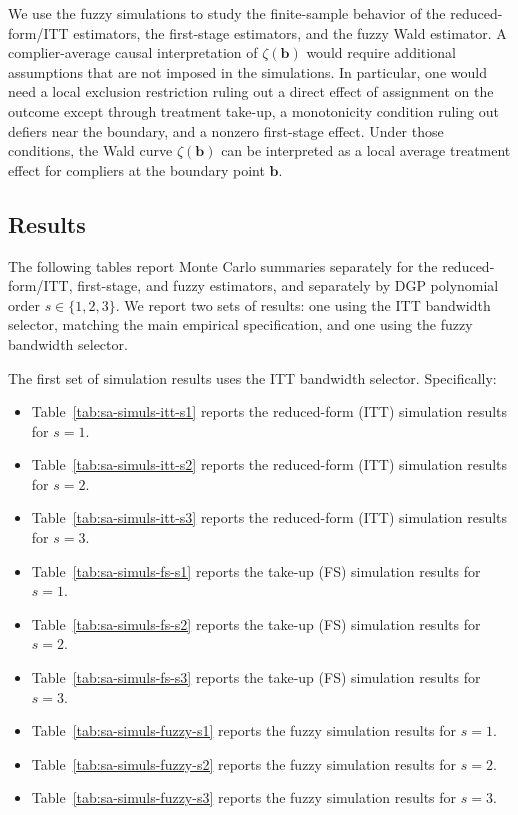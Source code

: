 \documentclass[10pt]{article}
\newcommand{\bb}{\mathbf{b}}
\begin{document}
We use the fuzzy simulations to study the finite-sample behavior of the reduced-form/ITT estimators, the first-stage estimators, and the fuzzy Wald estimator. A complier-average causal interpretation of $\zeta(\bb)$ would require additional assumptions that are not imposed in the simulations. In particular, one would need a local exclusion restriction ruling out a direct effect of assignment on the outcome except through treatment take-up, a monotonicity condition ruling out defiers near the boundary, and a nonzero first-stage effect. Under those conditions, the Wald curve $\zeta(\bb)$ can be interpreted as a local average treatment effect for compliers at the boundary point $\bb$.

\subsection{Results}

The following tables report Monte Carlo summaries separately for the reduced-form/ITT, first-stage, and fuzzy estimators, and separately by DGP polynomial order $s\in\{1,2,3\}$. We report two sets of results: one using the ITT bandwidth selector, matching the main empirical specification, and one using the fuzzy bandwidth selector.

The first set of simulation results uses the ITT bandwidth selector. Specifically:
\begin{itemize}
    \item Table~\ref{tab:sa-simuls-itt-s1} reports the reduced-form (ITT) simulation results for $s=1$.
    \item Table~\ref{tab:sa-simuls-itt-s2} reports the reduced-form (ITT) simulation results for $s=2$.
    \item Table~\ref{tab:sa-simuls-itt-s3} reports the reduced-form (ITT) simulation results for $s=3$.
    \item Table~\ref{tab:sa-simuls-fs-s1} reports the take-up (FS) simulation results for $s=1$.
    \item Table~\ref{tab:sa-simuls-fs-s2} reports the take-up (FS) simulation results for $s=2$.
    \item Table~\ref{tab:sa-simuls-fs-s3} reports the take-up (FS) simulation results for $s=3$.
    \item Table~\ref{tab:sa-simuls-fuzzy-s1} reports the fuzzy simulation results for $s=1$.
    \item Table~\ref{tab:sa-simuls-fuzzy-s2} reports the fuzzy simulation results for $s=2$.
    \item Table~\ref{tab:sa-simuls-fuzzy-s3} reports the fuzzy simulation results for $s=3$.
\end{itemize}
\end{document}
